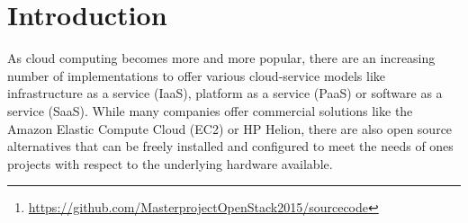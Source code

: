 \documentclass[conference]{IEEEtran}
\begin{document}




\maketitle

\begin{abstract}
Offering infrastructures as a service by means of cloud computing is gaining popularity. High availability aspects of these cloud computing systems are of great importance, as outages can be extremely costly. Setting up a cloud computing environment is very complex, thus making dependability testing non trivial. In our work, we introduce a system for installing a virtual OpenStack cloud computing environment and running dependability experiments on it\footnote{\url{https://github.com/MasterprojectOpenStack2015/sourcecode}}. The installation as well as the experiments are automated in order to achieve reproducible test results as easily as possible. We propose a first selection of experiments for our testing framework and describe the results.
\end{abstract}





%
\IEEEpeerreviewmaketitle



\section{Introduction}
As cloud computing becomes more and more popular, there are an increasing number of  implementations to offer various cloud-service models like infrastructure as a service (IaaS), platform as a service (PaaS) or software as a service (SaaS). While many companies offer commercial solutions like the Amazon Elastic Compute Cloud (EC2) or HP Helion, there are also open source alternatives that can be freely installed and configured to meet the needs of ones projects with respect to the underlying hardware available.
\end{document}
